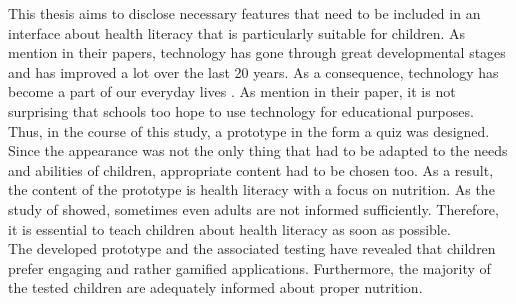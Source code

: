 This thesis aims to disclose necessary features that need to be included in an interface about health literacy that is particularly suitable for children. 
As \textcite{walker2000screen, sharmin2012effect} mention in their papers, technology has gone through great developmental stages and has improved a lot over the last 20 years. As a consequence, technology has become a part of our everyday lives \autocite{gikas2013mobile, gossen2012search}. As \textcite{walker2000screen} mention in their paper, it is not surprising that schools too hope to use technology for educational purposes.  
Thus, in the course of this study, a prototype in the form a quiz was designed. Since the appearance was not the only thing that had to be adapted to the needs and abilities of children, appropriate content had to be chosen too. As a result, the content of the prototype is health literacy with a focus on nutrition. As the study of \textcite{jordan2015gesundheitskompetenz} showed, sometimes even adults are not informed sufficiently. Therefore, it is essential to teach children about health literacy as soon as possible.\\
The developed prototype and the associated testing have revealed that children prefer engaging and rather gamified applications. Furthermore, the majority of the tested children are adequately informed about proper nutrition.